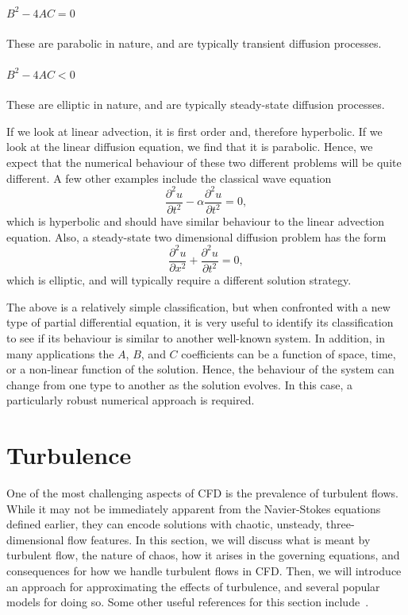 \subsubsection{$B^2-4AC = 0$}
These are parabolic in nature, and are typically transient diffusion processes.

\subsubsection{$B^2-4AC < 0$}
These are elliptic in nature, and are typically steady-state diffusion processes.

If we look at linear advection, it is first order and, therefore hyperbolic. If we look at the linear diffusion equation, we find that it is parabolic. Hence, we expect that the numerical behaviour of these two different problems will be quite different. A few other examples include the classical wave equation
\begin{equation}
	\frac{\partial^2 u}{\partial t^2} - \alpha\frac{\partial^2 u}{\partial t^2} = 0,
\end{equation}
which is hyperbolic and should have similar behaviour to the linear advection equation. Also, a steady-state two dimensional diffusion problem has the form
\begin{equation}
	\frac{\partial^2 u}{\partial x^2} + \frac{\partial^2 u}{\partial t^2} = 0,
\end{equation}
which is elliptic, and will typically require a different solution strategy.

The above is a relatively simple classification, but when confronted with a new type of partial differential equation, it is very useful to identify its classification to see if its behaviour is similar to another well-known system. In addition, in many applications the $A$, $B$, and $C$ coefficients can be a function of space, time, or a non-linear function of the solution. Hence, the behaviour of the system can change from one type to another as the solution evolves. In this case, a particularly robust numerical approach is required.
 
\chapter{Turbulence}
One of the most challenging aspects of CFD is the prevalence of turbulent flows. While it may not be immediately apparent from the Navier-Stokes equations defined earlier, they can encode solutions with chaotic, unsteady, three-dimensional flow features. In this section, we will discuss what is meant by turbulent flow, the nature of chaos, how it arises in the governing equations, and consequences for how we handle turbulent flows in CFD. Then, we will introduce an approach for approximating the effects of turbulence, and several popular models for doing so. Some other useful references for this section include~\cite{pope2001turbulent, davidson2015turbulence}.

